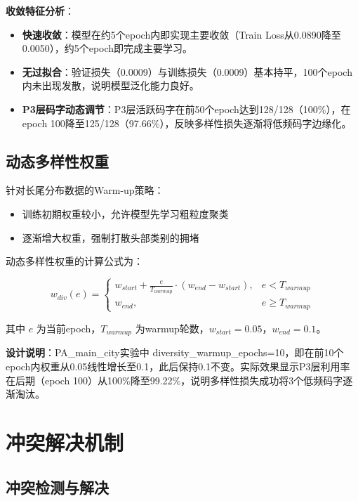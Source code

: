 \textbf{收敛特征分析}：

\begin{itemize}
    \item \textbf{快速收敛}：模型在约5个epoch内即实现主要收敛（Train Loss从0.0890降至0.0050），约5个epoch即完成主要学习。
    \item \textbf{无过拟合}：验证损失（0.0009）与训练损失（0.0009）基本持平，100个epoch内未出现发散，说明模型泛化能力良好。
    \item \textbf{P3层码字动态调节}：P3层活跃码字在前50个epoch达到128/128（100\%），在epoch 100降至125/128（97.66\%），反映多样性损失逐渐将低频码字边缘化。
\end{itemize}

\subsection{动态多样性权重}
\label{sec:dynamic_diversity}

针对长尾分布数据的Warm-up策略：
\begin{itemize}
    \item 训练初期权重较小，允许模型先学习粗粒度聚类
    \item 逐渐增大权重，强制打散头部类别的拥堵
\end{itemize}

动态多样性权重的计算公式为：

\begin{equation}
w_{div}(e) =
\begin{cases}
w_{start} + \frac{e}{T_{warmup}} \cdot (w_{end} - w_{start}), & e < T_{warmup} \\
w_{end}, & e \geq T_{warmup}
\end{cases}
\label{eq:dynamic_diversity}
\end{equation}

其中 $e$ 为当前epoch，$T_{warmup}$ 为warmup轮数，$w_{start}=0.05$，$w_{end}=0.1$。

\textbf{设计说明}：PA\_main\_city实验中 diversity\_warmup\_epochs=10，即在前10个epoch内权重从0.05线性增长至0.1，此后保持0.1不变。实际效果显示P3层利用率在后期（epoch 100）从100\%降至99.22\%，说明多样性损失成功将3个低频码字逐渐淘汰。

\section{冲突解决机制}
\label{sec:collision_resolution_detail}

\subsection{冲突检测与解决}
\label{sec:collision_detection}


